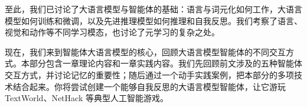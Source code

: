至此，我们已讨论了大语言模型与智能体的基础：语言与词元化如何工作，大语言模型如何训练和微调，以及先进推理模型如何推理和自我反思。我们考察了语言、视觉和动作等不同学习模态，也讨论了元学习的复杂之处。

现在，我们来到智能体大语言模型的核心，回顾大语言模型智能体的不同交互方式。本部分包含一章理论内容和一章实践内容。我们先回顾前文涉及的五种智能体交互方式，并讨论记忆的重要性；随后通过一个动手实践案例，把本部分的多项技术结合起来。你将尝试创建一个能够自我反思的大语言模型智能体，让它游玩 TextWorld、NetHack 等典型人工智能游戏。
